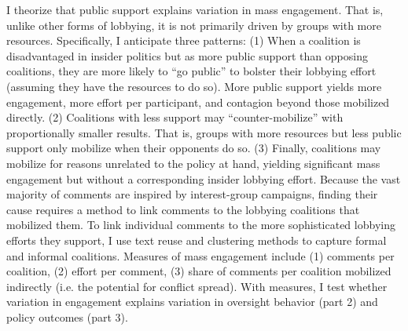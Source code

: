 I theorize that public support explains variation in mass engagement. That is, unlike other forms of lobbying, it is not primarily driven by groups with more resources. Specifically, I anticipate three patterns:
(1) When a coalition is disadvantaged in insider politics but as more public support than opposing coalitions, they are more likely to ``go public'' to bolster their lobbying effort (assuming they have the resources to do so). More public support yields more engagement, more effort per participant, and contagion beyond those mobilized directly. (2) Coalitions with less support may ``counter-mobilize'' with proportionally smaller results. That is, groups with more resources but less public support only mobilize when their opponents do so. (3) Finally, coalitions may mobilize for reasons unrelated to the policy at hand, yielding significant mass engagement but without a corresponding insider lobbying effort. 
Because the vast majority of comments are inspired by interest-group campaigns, finding their cause requires a method to link comments to the lobbying coalitions that mobilized them.  
To link individual comments to the more sophisticated lobbying efforts they support, I use text reuse and clustering methods to capture formal and informal coalitions.
Measures of mass engagement include 
(1) comments per coalition, %
(2) effort per comment, %
(3) share of comments per coalition mobilized indirectly (i.e. the potential for conflict spread).
With measures, I test whether variation in engagement explains variation in oversight behavior (part 2) and policy outcomes (part 3).

